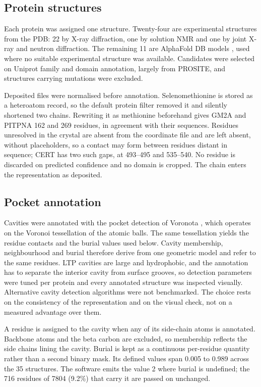 \subsection{Protein structures}

Each protein was assigned one structure. Twenty-four are experimental structures from the PDB: 22
by X-ray diffraction, one by solution NMR and one by joint X-ray and neutron diffraction. The
remaining 11 are AlphaFold DB models \cite{alphafold}, used where no suitable experimental
structure was available. Candidates were selected on Uniprot family and domain annotation, largely
from PROSITE, and structures carrying mutations were excluded.

Deposited files were normalised before annotation. Selenomethionine is stored as a heteroatom
record, so the default protein filter removed it and silently shortened two chains. Rewriting it
as methionine beforehand gives GM2A and PITPNA 162 and 269 residues, in agreement with their
sequences. Residues unresolved in the crystal are absent from the coordinate file and are left
absent, without placeholders, so a contact may form between residues distant in sequence; CERT has
two such gaps, at 493--495 and 535--540. No residue is discarded on predicted confidence and no
domain is cropped. The chain enters the representation as deposited.

\subsection{Pocket annotation}

Cavities were annotated with the pocket detection of Voronota \cite{voronota}, which operates on
the Voronoi tessellation of the atomic balls. The same tessellation yields the residue contacts
and the burial values used below. Cavity membership, neighbourhood and burial therefore derive
from one geometric model and refer to the same residues. LTP cavities are large and hydrophobic,
and the annotation has to separate the interior cavity from surface grooves, so detection
parameters were tuned per protein and every annotated structure was inspected visually.
Alternative cavity detection algorithms were not benchmarked. The choice rests on the consistency
of the representation and on the visual check, not on a measured advantage over them.

A residue is assigned to the cavity when any of its side-chain atoms is annotated. Backbone atoms
and the beta carbon are excluded, so membership reflects the side chains lining the cavity. Burial
is kept as a continuous per-residue quantity rather than a second binary mask. Its defined values
span 0.005 to 0.989 across the 35 structures. The software emits the value 2 where burial is
undefined; the 716 residues of 7804 (9.2\%) that carry it are passed on unchanged.

